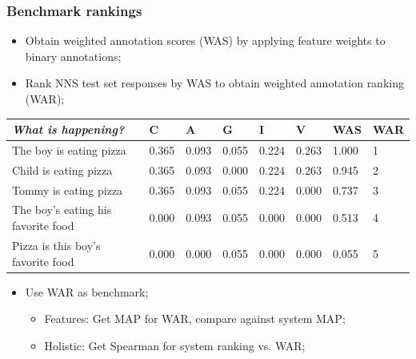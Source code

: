 \documentclass[handout,xcolor={dvipsnames}]{beamer}
\begin{document}
\begin{frame}
\frametitle{Benchmark rankings}
\small
\begin{itemize}
\pause
\item Obtain weighted annotation scores (WAS) by applying feature weights to binary annotations;
\pause
\item Rank NNS test set responses by WAS to obtain weighted annotation ranking (WAR);
\pause
\end{itemize}


\vspace{-1em}
\begin{footnotesize}
\begin{table}[htb!]
\begin{center}
\begin{tabular}{|p{2.7cm}||p{.7cm}|p{.7cm}|p{.7cm}|p{.7cm}|p{.7cm}|p{.7cm}|p{.6cm}|}
\hline
\textit{What is happening?} & C & A & G & I & V & WAS & WAR \\
\hline
\hline
The boy is eating pizza & 0.365 & 0.093 & 0.055 & 0.224 & 0.263 & 1.000 & 1 \\
\hline
Child is eating pizza & 0.365 & 0.093 & 0.000 & 0.224 & 0.263 & 0.945 & 2 \\
\hline
Tommy is eating pizza & 0.365 & 0.093 & 0.055 & 0.224 & 0.000 & 0.737 & 3 \\
\hline
The boy's eating his favorite food & 0.000 & 0.093 & 0.055 & 0.000 & 0.000 & 0.513 & 4 \\
\hline
Pizza is this boy's favorite food & 0.000 & 0.000 & 0.055 & 0.000 & 0.000 & 0.055 & 5 \\
\hline
\end{tabular}
\end{center}
\end{table}
\end{footnotesize}

\pause
\begin{itemize}
\item Use WAR as benchmark;
\begin{itemize}
\item Features: Get MAP for WAR, compare against system MAP;
\pause
\item Holistic: Get Spearman for system ranking vs. WAR;
\end{itemize}
\end{itemize}

\end{frame}
\end{document}
